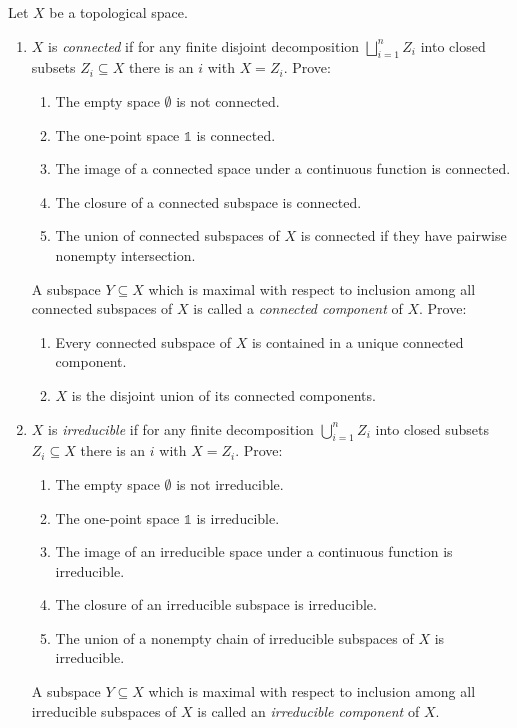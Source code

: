 \documentclass{exercises}
\begin{document}
\begin{exercise}
  Let $X$ be a topological space.
  \begin{enumerate}
    \item $X$ is \emph{connected} if for any finite disjoint decomposition $⨆_{i=1}^nZ_i$ into closed subsets $Z_i⊆X$ there is an $i$ with $X=Z_i$.
      Prove:
      \begin{enumerate}
        \item The empty space $∅$ is not connected.
        \item The one-point space $𝟙$ is connected.
        \item The image of a connected space under a continuous function is connected.
        \item The closure of a connected subspace is connected.
        \item The union of connected subspaces of $X$ is connected if they have pairwise nonempty intersection.
      \end{enumerate}
      A subspace $Y⊆X$ which is maximal with respect to inclusion among all connected subspaces of $X$ is called a \emph{connected component} of $X$.
      Prove:
      \begin{enumerate}[start=6]
        \item Every connected subspace of $X$ is contained in a unique connected component.
        \item $X$ is the disjoint union of its connected components.
      \end{enumerate}
    \item $X$ is \emph{irreducible} if for any finite decomposition $⋃_{i=1}^nZ_i$ into closed subsets $Z_i⊆X$ there is an $i$ with $X=Z_i$.
      Prove:
      \begin{enumerate}
        \item The empty space $∅$ is not irreducible.
        \item The one-point space $𝟙$ is irreducible.
        \item The image of an irreducible space under a continuous function is irreducible.
        \item The closure of an irreducible subspace is irreducible.
        \item The union of a nonempty chain of irreducible subspaces of $X$ is irreducible.
      \end{enumerate}
      A subspace $Y⊆X$ which is maximal with respect to inclusion among all irreducible subspaces of $X$ is called an \emph{irreducible component} of $X$.

\end{enumerate}
\end{exercise}
\end{document}

